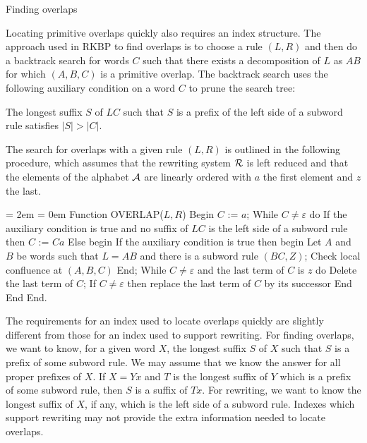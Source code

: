 \bigskip

 Finding overlaps

\nobreak

Locating primitive overlaps quickly also requires an index structure.
The approach used in RKBP to find overlaps is to choose a rule $(L,R)$
and then do a backtrack search for words $C$ such that there exists a
decomposition of $L$ as $AB$ for which $(A,B,C)$ is a primitive
overlap.  The backtrack search uses the following auxiliary condition
on a word $C$ to prune the search tree:
\smallskip

{\narrower \noindent The longest suffix $S$ of $LC$ such that $S$ is a
prefix of the left side of a subword rule satisfies $|S|>|C|$.\par}

\medskip

The search for overlaps with a given rule $(L,R)$ is outlined in
the following procedure, which assumes that the rewriting system
${\cal R}$ is left reduced and that the elements of the alphabet
${\cal A}$ are linearly ordered with $a$ the first element and $z$ the
last.

\medskip

{\parindent = 2em \parskip = 0em \obeylines
\ind Function OVERLAP($L,R$)
\ind Begin
\indb $C$ := $a$;
\smallskip
\indb While $C\neq\varepsilon$ do
\indc  If the auxiliary condition is true and no suffix of $LC$ is the left side
\indc \quad of a subword rule then
\indd    $C$ := $Ca$
\smallskip
\indc  Else begin
\indd   If the auxiliary condition is true then begin
\inde    Let $A$ and $B$ be words such that $L=AB$ and there is a
\inde \quad subword rule $(BC,Z)$;
\inde    Check local confluence at $(A,B,C)$
\indd   End;
\smallskip
\indd   While $C\ne\varepsilon$ and the last term of $C$ is $z$ do
\inde    Delete the last term of $C$;
\smallskip
\indd   If $C\ne\varepsilon$ then replace the last term of $C$ by its successor
\indc  End
\indb End
\ind End.}

\medskip

The requirements for an index used to locate overlaps quickly are
slightly different from those for an index used to support rewriting.
For finding overlaps, we want to know, for a given word $X$, the
longest suffix $S$ of $X$ such that $S$ is a prefix of some subword
rule.  We may assume that we know the answer for all proper prefixes
of $X$.  If $X=Yx$ and $T$ is the longest suffix of $Y$ which is a
prefix of some subword rule, then $S$ is a suffix of $Tx$.  For
rewriting, we want to know the longest suffix of $X$, if any, which is
the left side of a subword rule.  Indexes which support rewriting may
not provide the extra information needed to locate overlaps.

